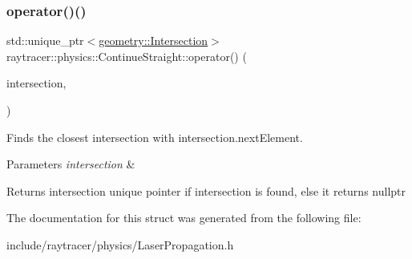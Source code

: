 \subsubsection{\texorpdfstring{operator()()}{operator()()}}
{\footnotesize\ttfamily std\+::unique\+\_\+ptr$<$\hyperlink{structraytracer_1_1geometry_1_1Intersection}{geometry\+::\+Intersection}$>$ raytracer\+::physics\+::\+Continue\+Straight\+::operator() (\begin{DoxyParamCaption}\item[{const \hyperlink{structraytracer_1_1geometry_1_1Intersection}{geometry\+::\+Intersection} \&}]{intersection,  }\item[{const \hyperlink{structraytracer_1_1physics_1_1LaserRay}{Laser\+Ray} \&}]{ }\end{DoxyParamCaption})}



Finds the closest intersection with intersection.\+next\+Element. 


\begin{DoxyParams}{Parameters}
{\em intersection} & \\
\hline
\end{DoxyParams}
\begin{DoxyReturn}{Returns}
intersection unique pointer if intersection is found, else it returns nullptr 
\end{DoxyReturn}


The documentation for this struct was generated from the following file\+:\begin{DoxyCompactItemize}
\item 
include/raytracer/physics/Laser\+Propagation.\+h\end{DoxyCompactItemize}
